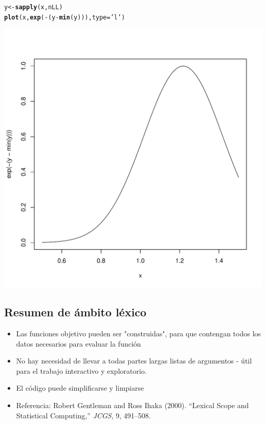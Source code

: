 \documentclass{article}\usepackage[]{graphicx}\usepackage[]{color}
\makeatletter
\def\maxwidth{ %
  \ifdim\Gin@nat@width>\linewidth
    \linewidth
  \else
    \Gin@nat@width
  \fi
}
\newcommand{\hlstr}[1]{\textcolor[rgb]{0.192,0.494,0.8}{#1}}%
\newcommand{\hlopt}[1]{\textcolor[rgb]{0,0,0}{#1}}%
\newcommand{\hlstd}[1]{\textcolor[rgb]{0.345,0.345,0.345}{#1}}%
\newcommand{\hlkwb}[1]{\textcolor[rgb]{0.69,0.353,0.396}{#1}}%
\newcommand{\hlkwc}[1]{\textcolor[rgb]{0.333,0.667,0.333}{#1}}%
\newcommand{\hlkwd}[1]{\textcolor[rgb]{0.737,0.353,0.396}{\textbf{#1}}}%
\newenvironment{kframe}{%
 \def\at@end@of@kframe{}%
 \ifinner\ifhmode%
  \def\at@end@of@kframe{\end{minipage}}%
  \begin{minipage}{\columnwidth}%
 \fi\fi%
 \def\FrameCommand##1{\hskip\@totalleftmargin \hskip-\fboxsep
 \colorbox{shadecolor}{##1}\hskip-\fboxsep
     \hskip-\linewidth \hskip-\@totalleftmargin \hskip\columnwidth}%
 \MakeFramed {\advance\hsize-\width
   \@totalleftmargin\z@ \linewidth\hsize
   \@setminipage}}%
 {\par\unskip\endMakeFramed%
 \at@end@of@kframe}
\newenvironment{knitrout}{}{} %
\makeatother
\begin{document}
\begin{knitrout}
\begin{kframe}
\begin{alltt}
\hlstd{y} \hlkwb{<-} \hlkwd{sapply}\hlstd{(x, nLL)}
\hlkwd{plot}\hlstd{(x,} \hlkwd{exp}\hlstd{(}\hlopt{-}\hlstd{(y} \hlopt{-} \hlkwd{min}\hlstd{(y))),} \hlkwc{type} \hlstd{=} \hlstr{'l'}\hlstd{)}
\end{alltt}
\end{kframe}
\includegraphics[width=\maxwidth]{figure/unnamed-chunk-87-2} 

\end{knitrout}
    
  \subsection{Resumen de ámbito léxico}
  \begin{itemize}
    \item Las funciones objetivo pueden ser "construidas", para que contengan todos los datos necesarios para evaluar la función
    \item No hay necesidad de llevar a todas partes largas listas de argumentos - útil para el trabajo interactivo y exploratorio.
    \item El código puede simplificarse y limpiarse
    \item Referencia: Robert Gentleman and Ross Ihaka (2000). “Lexical Scope and Statistical Computing,” \emph{JCGS}, 9, 491–508.
  \end{itemize}
\end{document}
